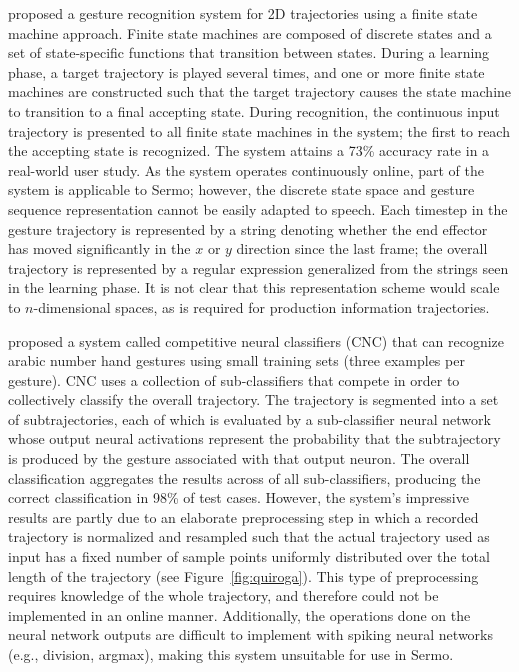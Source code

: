 \citet{kiliboz2015} proposed
a gesture recognition system
for 2D trajectories
using a finite state machine approach.
Finite state machines are composed of
discrete states and a set of state-specific
functions that transition between states.
During a learning phase,
a target trajectory is played
several times,
and one or more finite state machines
are constructed such that
the target trajectory
causes the state machine
to transition to a final accepting state.
During recognition,
the continuous input trajectory
is presented to all finite state machines
in the system;
the first to reach the accepting state is recognized.
The system attains a 73\% accuracy rate
in a real-world user study.
As the system operates continuously online,
part of the system is applicable to Sermo;
however, the discrete state space and
gesture sequence representation
cannot be easily adapted to speech.
Each timestep in the gesture trajectory
is represented by a string denoting whether the
end effector has moved significantly
in the $x$ or $y$ direction since the last frame;
the overall trajectory is represented
by a regular expression generalized from
the strings seen in the learning phase.
It is not clear that this representation scheme
would scale to $n$-dimensional spaces,
as is required for production information trajectories.

\citet{quiroga2013}
proposed a system called competitive neural classifiers (CNC)
that can recognize arabic number hand gestures
using small training sets (three examples per gesture).
CNC uses a collection of sub-classifiers
that compete in order to collectively
classify the overall trajectory.
The trajectory is segmented
into a set of subtrajectories,
each of which is evaluated by
a sub-classifier neural network
whose output neural activations
represent the probability that
the subtrajectory is produced by
the gesture associated with that output neuron.
The overall classification aggregates the results
across of all sub-classifiers,
producing the correct classification
in 98\% of test cases.
However, the system's impressive results
are partly due to an elaborate preprocessing step
in which a recorded trajectory
is normalized and resampled
such that the actual trajectory used as input
has a fixed number of sample points
uniformly distributed over
the total length of the trajectory
(see Figure~\ref{fig:quiroga}).
This type of preprocessing
requires knowledge of the whole trajectory,
and therefore could not be implemented
in an online manner.
Additionally, the operations done
on the neural network outputs
are difficult to implement
with spiking neural networks
(e.g., division, argmax),
making this system unsuitable
for use in Sermo.


